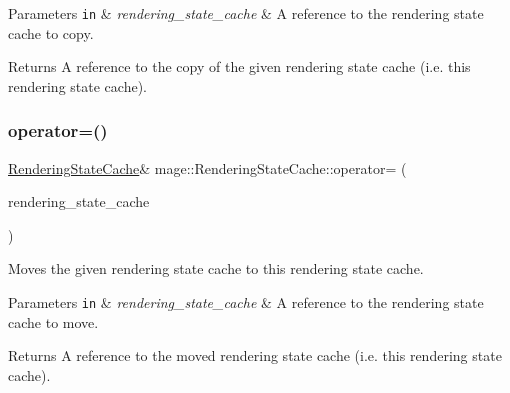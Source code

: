 \begin{DoxyParams}[1]{Parameters}
\mbox{\tt in}  & {\em rendering\+\_\+state\+\_\+cache} & A reference to the rendering state cache to copy. \\
\hline
\end{DoxyParams}
\begin{DoxyReturn}{Returns}
A reference to the copy of the given rendering state cache (i.\+e. this rendering state cache). 
\end{DoxyReturn}
\hypertarget{structmage_1_1_rendering_state_cache_aac885d9a83e196299ac896b3847f471b}{}\label{structmage_1_1_rendering_state_cache_aac885d9a83e196299ac896b3847f471b} 
\subsubsection{\texorpdfstring{operator=()}{operator=()}\hspace{0.1cm}{\footnotesize\ttfamily [2/2]}}
{\footnotesize\ttfamily \hyperlink{structmage_1_1_rendering_state_cache}{Rendering\+State\+Cache}\& mage\+::\+Rendering\+State\+Cache\+::operator= (\begin{DoxyParamCaption}\item[{\hyperlink{structmage_1_1_rendering_state_cache}{Rendering\+State\+Cache} \&\&}]{rendering\+\_\+state\+\_\+cache }\end{DoxyParamCaption})\hspace{0.3cm}{\ttfamily [delete]}}

Moves the given rendering state cache to this rendering state cache.


\begin{DoxyParams}[1]{Parameters}
\mbox{\tt in}  & {\em rendering\+\_\+state\+\_\+cache} & A reference to the rendering state cache to move. \\
\hline
\end{DoxyParams}
\begin{DoxyReturn}{Returns}
A reference to the moved rendering state cache (i.\+e. this rendering state cache). 
\end{DoxyReturn}
\hypertarget{structmage_1_1_rendering_state_cache_a60dc79d7d5c0bf28ba47c1ddca593417}{}\label{structmage_1_1_rendering_state_cache_a60dc79d7d5c0bf28ba47c1ddca593417} 
